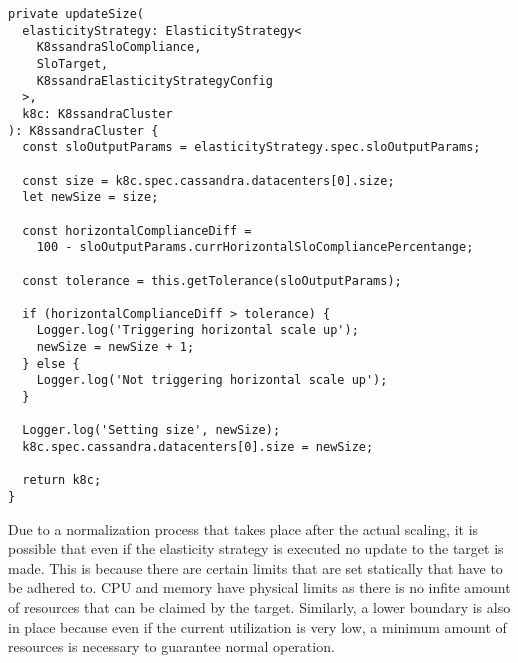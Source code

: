 \begin{lstlisting}[caption={Method of diagonal elasticity strategy controller which manages horizontal scaling},
                    captionpos=b,
                    label=lst:diagonal-elasticity:updateSize,
                    float]
private updateSize(
  elasticityStrategy: ElasticityStrategy<
    K8ssandraSloCompliance,
    SloTarget,
    K8ssandraElasticityStrategyConfig
  >,
  k8c: K8ssandraCluster
): K8ssandraCluster {
  const sloOutputParams = elasticityStrategy.spec.sloOutputParams;

  const size = k8c.spec.cassandra.datacenters[0].size;
  let newSize = size;

  const horizontalComplianceDiff =
    100 - sloOutputParams.currHorizontalSloCompliancePercentange;

  const tolerance = this.getTolerance(sloOutputParams);

  if (horizontalComplianceDiff > tolerance) {
    Logger.log('Triggering horizontal scale up');
    newSize = newSize + 1;
  } else {
    Logger.log('Not triggering horizontal scale up');
  }

  Logger.log('Setting size', newSize);
  k8c.spec.cassandra.datacenters[0].size = newSize;

  return k8c;
}
\end{lstlisting}

Due to a normalization process that takes place after the actual scaling, it is possible that even if the elasticity strategy is executed no update to the target is made. This is because there are certain limits that are set statically that have to be adhered to. CPU and memory have physical limits as there is no infite amount of resources that can be claimed by the target. Similarly, a lower boundary is also in place because even if the current utilization is very low, a minimum amount of resources is necessary to guarantee normal operation.
